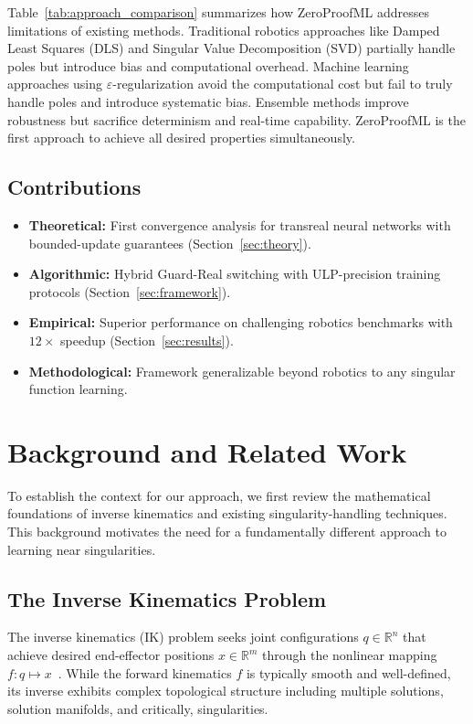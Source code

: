 \documentclass[twoside,11pt]{article}
\begin{document}
Table~\ref{tab:approach_comparison} summarizes how ZeroProofML addresses limitations of existing methods. Traditional robotics approaches like Damped Least Squares (DLS) and Singular Value Decomposition (SVD) partially handle poles but introduce bias and computational overhead. Machine learning approaches using $\varepsilon$-regularization avoid the computational cost but fail to truly handle poles and introduce systematic bias. Ensemble methods improve robustness but sacrifice determinism and real-time capability. ZeroProofML is the first approach to achieve all desired properties simultaneously.

\subsection{Contributions}
\begin{tcolorbox}[colback=blue!5!white,colframe=blue!75!black,title=\textbf{Key Contributions}]
\begin{itemize}
\item \textbf{Theoretical:} First convergence analysis for transreal neural networks with bounded-update guarantees (Section~\ref{sec:theory}).
\item \textbf{Algorithmic:} Hybrid Guard-Real switching with ULP-precision training protocols (Section~\ref{sec:framework}).
\item \textbf{Empirical:} Superior performance on challenging robotics benchmarks with $12\times$ speedup (Section~\ref{sec:results}).
\item \textbf{Methodological:} Framework generalizable beyond robotics to any singular function learning.
\end{itemize}
\end{tcolorbox}

\section{Background and Related Work}
\label{sec:background}
To establish the context for our approach, we first review the mathematical foundations of inverse kinematics and existing singularity-handling techniques. This background motivates the need for a fundamentally different approach to learning near singularities.

\subsection{The Inverse Kinematics Problem}
The inverse kinematics (IK) problem seeks joint configurations $q \in \mathbb{R}^n$ that achieve desired end-effector positions $x \in \mathbb{R}^m$ through the nonlinear mapping $f: q \mapsto x$~\citep{siciliano2016robotics}. While the forward kinematics $f$ is typically smooth and well-defined, its inverse exhibits complex topological structure including multiple solutions, solution manifolds, and critically, singularities.
\end{document}
